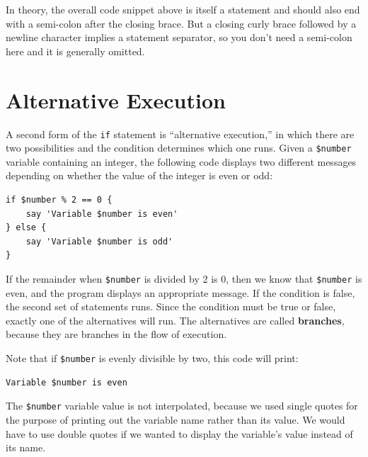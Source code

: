 In theory, the overall code snippet above is itself a statement 
and should also end with a semi-colon after the closing brace. 
But a closing curly brace followed by a newline character implies a statement separator, so you don't need a semi-colon here and it is generally omitted.



\section{Alternative Execution}
\label{alternative.execution}

A second form of the {\tt if} statement is ``alternative execution,'' 
in which there are two possibilities and the condition determines
which one runs.  Given a \verb'$number' variable containing an 
integer, the following code displays two different messages 
depending on whether the value of the integer is even or odd:

\begin{verbatim}
if $number % 2 == 0 {
    say 'Variable $number is even'
} else {
    say 'Variable $number is odd'
}
\end{verbatim}
%
If the remainder when {\tt \$number} is divided by 2 is 0, 
then we know that {\tt \$number} is even, and the program 
displays an appropriate message.  If
the condition is false, the second set of statements runs.
Since the condition must be true or false, exactly one of the
alternatives will run.  The alternatives are called 
{\bf branches}, because they are branches in the flow of 
execution.

Note that if \verb'$number' is evenly divisible by two, 
this code will print:

\begin{verbatim} 
Variable $number is even
\end{verbatim}

The \verb'$number' variable value is not interpolated, 
because we used single quotes for the purpose 
of printing out the variable name rather 
than its value. We would have to use double quotes if 
we wanted to display the variable's value instead of its 
name.


